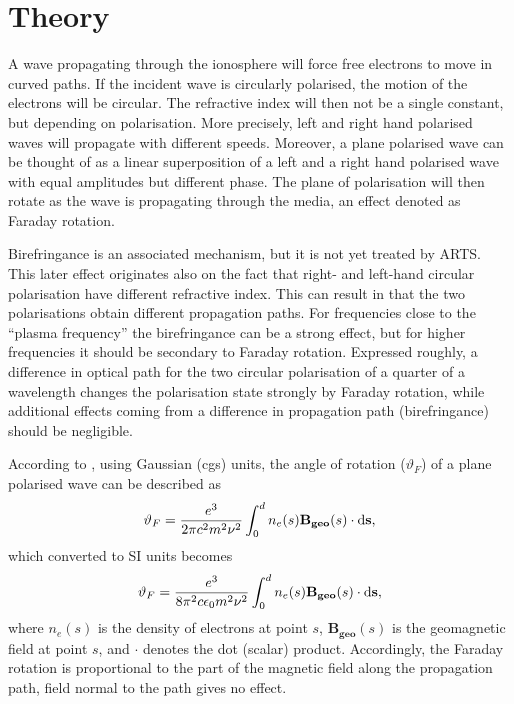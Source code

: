 \section{Theory}
\label{sec:faraday:theory}

A wave propagating through the ionosphere will force free electrons to move in
curved paths. If the incident wave is circularly polarised, the motion of the
electrons will be circular. The refractive index will then not be a single
constant, but depending on polarisation. More precisely, left and right hand
polarised waves will propagate with different speeds. Moreover, a plane
polarised wave can be thought of as a linear superposition of a left and a
right hand polarised wave with equal amplitudes but different phase. The plane
of polarisation will then rotate as the wave is propagating through the media,
an effect denoted as Faraday rotation.

Birefringance  is an associated mechanism, but it is not
yet treated by ARTS. This later effect originates also on the fact that right-
and left-hand circular polarisation have different refractive index. This can
result in that the two polarisations obtain different propagation paths. For
frequencies close to the ``plasma frequency'' the birefringance can be a strong
effect, but for higher frequencies it should be secondary to Faraday rotation.
Expressed roughly, a difference in optical path for the two circular
polarisation of a quarter of a wavelength changes the polarisation state
strongly by Faraday rotation, while additional effects coming from a difference
in propagation path (birefringance) should be negligible.

According to \citep{rybicki:radia:79}, using Gaussian (cgs) units, the angle of
rotation (\(\vartheta_{F}\)) of a plane polarised wave can be described as
\begin{displaymath}
\vartheta_{F}=
\frac{e^{3}}{2\pi c^2 m^{2}\nu^{2}}
\int_{0}^{d}n_{e}(s) {\bf B_{geo}} (s) \cdot  {\bf \ensuremath{\mathrm{d}}s},  
\end{displaymath}
which converted to SI units becomes
\begin{equation}
\vartheta_{F}=\frac{e^{3}}{8\pi^2 c\epsilon_{0}m^{2}\nu^{2}}
\int_{0}^{d}n_{e}(s) {\bf B_{geo}} (s) \cdot  {\bf \ensuremath{\mathrm{d}}s},    
\end{equation}
where \(n_{e}(s)\) is the density of electrons at point \(s\),
\(\mathbf{B_{geo}}(s)\) is the geomagnetic field at point \(s\), and \(\cdot\)
denotes the dot (scalar) product. Accordingly, the Faraday rotation is
proportional to the part of the magnetic field along the propagation path,
field normal to the path gives no effect.

